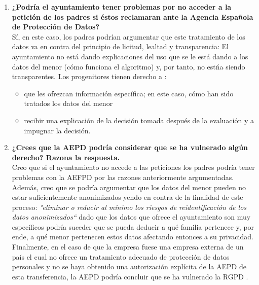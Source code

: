 \documentclass[10pt,a4paper]{article}
\begin{document}
\begin{enumerate}
\begin{enumerate}
\item \textbf{¿Podría el ayuntamiento tener problemas por no acceder a la petición de los padres si éstos reclamaran ante la Agencia Española de Protección de Datos?}\\
Sí, en este caso, los padres podrían argumentar que este tratamiento de los datos va en contra del principio de licitud, lealtad y transparencia: El ayuntamiento no está dando explicaciones del uso que se le está dando a los datos del menor (cómo funciona el algoritmo) y, por tanto, no estńa siendo transparentes. Los progenitores tienen derecho a \cite[art 22 apartado 1]{RGPD}:
\begin{itemize}
\item que les ofrezcan información específica; en este caso, cómo han sido tratados los datos del menor
\item recibir una explicación de la decisión tomada después de la evaluación y a impugnar la
decisión.
\end{itemize}
\item \textbf{¿Crees que la AEPD podría considerar que se ha vulnerado algún derecho? Razona la respuesta.}\\
Creo que si el ayuntamiento no accede a las peticiones los padres podría tener problemas con la AEFPD por las razones anteriormente argumentadas. Además, creo que se podría argumentar que los datos del menor pueden no estar suficientemente anonimizados yendo en contra de la finalidad de este proceso: \textit{"eliminar o reducir al mínimo los riesgos de reidentificación de los datos anonimizados``} \cite{guia} dado que los datos que ofrece el ayuntamiento son muy específicos podría suceder que se pueda deducir a qué familia pertenece y, por ende, a qué menor pertenecen estos datos afectando entonces a su privacidad.\\
Finalmente, en el caso de que la empresa fuese una empresa externa de un país el cual no ofrece un tratamiento adecuado de protección de datos personales y no se haya obtenido una autorización explícita de la AEPD de esta transferencia, la AEPD podría concluir que se ha vulnerado la RGPD \cite[art 42]{RGPD}.
\end{enumerate}

\end{enumerate}
\end{document}
